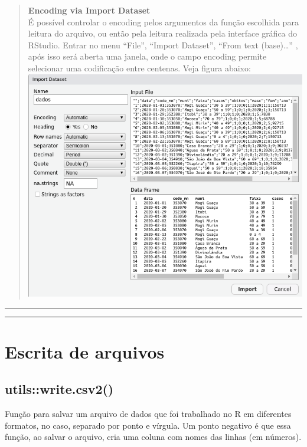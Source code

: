 \documentclass[
]{book}
\theoremstyle{definition}
\theoremstyle{definition}
\theoremstyle{definition}
\theoremstyle{definition}
\theoremstyle{remark}
\begin{document}
\begin{quote}
\textbf{Encoding via Import Dataset}\\
É possível controlar o encoding pelos argumentos da função escolhida para leitura do arquivo, ou então pela leitura realizada pela interface gráfica do RStudio. Entrar no menu ``File'', ``Import Dataset'', ``From text (base)\ldots{}'' , após isso será aberta uma janela, onde o campo encoding permite selecionar uma codificação entre centenas. Veja figura abaixo:
\includegraphics{ilustracoes/import_dataset.png}
\end{quote}

\begin{center}\rule{0.5\linewidth}{0.5pt}\end{center}

\begin{center}\rule{0.5\linewidth}{0.5pt}\end{center}

\hypertarget{escrita-de-arquivos}{%
\section{Escrita de arquivos}\label{escrita-de-arquivos}}

\hypertarget{utilswrite.csv2}{%
\subsection{utils::write.csv2()}\label{utilswrite.csv2}}

Função para salvar um arquivo de dados que foi trabalhado no R em diferentes formatos, no caso, separado por ponto e vírgula. Um ponto negativo é que essa função, ao salvar o arquivo, cria uma coluna com nomes das linhas (em números).
\end{document}
